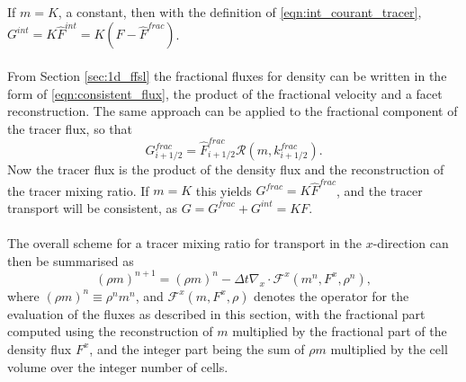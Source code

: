 \documentclass[11pt,a4paper]{article}
\begin{document}
If $m=K$, a constant, then with the definition of \eqref{eqn:int_courant_tracer}, $G^{int}=K\widehat{F}^{int}=K(F - \widehat{F}^{frac})$. \\
\\
From Section \ref{sec:1d_ffsl} the fractional fluxes for density can be written in the form of \eqref{eqn:consistent_flux}, the product of the fractional velocity and a facet reconstruction.
The same approach can be applied to the fractional component of the tracer flux, so that
\begin{equation}
G_{i+1/2}^{frac} = \widehat{F}_{i+1/2}^{frac} \mathcal{R}(m,k_{i+1/2}^{frac}).
\end{equation}
Now the tracer flux is the product of the density flux and the reconstruction of the tracer mixing ratio.
If $m=K$ this yields $G^{frac}=K\widehat{F}^{frac}$, and the tracer transport will be consistent, as $G=G^{frac}+G^{int}=KF$. \\
\\
The overall scheme for a tracer mixing ratio for transport in the $x$-direction can then be summarised as
\begin{equation} \label{eqn:1D_density}
(\rho m)^{n+1} = (\rho m)^n - \Delta t \nabla_x\cdot \mathcal{F}^x(m^n,F^x,\rho^n),
\end{equation}
where $(\rho m)^n\equiv \rho^n m^n$, and $\mathcal{F}^x(m,F^x,\rho)$ denotes the operator for the evaluation of the fluxes as described in this section, with the fractional part computed using the reconstruction of $m$ multiplied by the fractional part of the density flux $F^x$, and the integer part being the sum of $\rho m$ multiplied by the cell volume over the integer number of cells.
\end{document}
